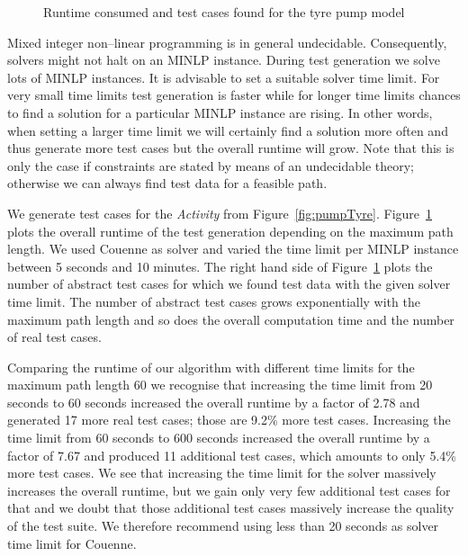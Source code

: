 \documentclass[runningheads,a4paper]{llncs}%
\newcommand{\UMLType}[1]{\textsf{\textit{#1}}} %
\begin{document}
\begin{figure}
%
\caption{Runtime consumed and test cases found for the tyre pump model%
}%
\label{fig:ExplodingTyresRuntime}%
\end{figure}%
Mixed integer non--linear programming is in general undecidable. Consequently,
solvers might not halt on an MINLP instance. During test generation we solve
lots of MINLP instances. It is advisable to set a suitable solver time limit.
For very small time limits test generation is faster while for longer time
limits chances to find a solution for a particular MINLP instance are rising. In
other words, when setting a larger time limit we will certainly find a solution
more often and thus generate more test cases but the overall runtime will grow.
Note that this is only the case if constraints are stated by means of an
undecidable theory; otherwise we can always find test data for a feasible path.

We generate test cases for the \UMLType{Activity} from
Figure~\ref{fig:pumpTyre}.
Figure~\ref{fig:ExplodingTyresRuntime} plots the overall runtime of the test
generation depending on the maximum path length. We used Couenne as solver and
varied the time limit per MINLP instance between 5 seconds and 10 minutes. The
right hand side of Figure~\ref{fig:ExplodingTyresRuntime} plots the number of
abstract test cases for which we found test data with the given solver time
limit. The number of abstract test cases grows exponentially with the maximum
path length and so does the overall computation time and the number of real test
cases.

Comparing the runtime of our algorithm with different time limits for the
maximum path length 60 we recognise that increasing the time limit from 20
seconds to 60 seconds increased the overall runtime by a factor of 2.78 and
generated 17 more real test cases; those are 9.2\% more test cases. Increasing
the time limit from 60 seconds to 600 seconds increased the overall runtime by a
factor of 7.67 and produced 11 additional test cases, which amounts to only
5.4\% more test cases. We see that increasing the time limit for the solver
massively increases the overall runtime, but we gain only very few additional
test cases for that and we doubt that those additional test cases massively
increase the quality of the test suite. We therefore recommend using less than
20 seconds as solver time limit for Couenne.
%
\end{document}
